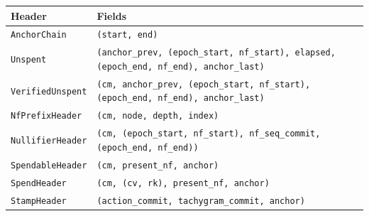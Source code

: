 \documentclass[11pt,a4paper]{article}
\theoremstyle{definition}
\begin{document}
\begin{table}[htbp]
\centering
\small
\begin{tabular}{@{}lp{10.2cm}@{}}
\toprule
Header & Fields \\
\midrule
\texttt{AnchorChain} & \texttt{(start, end)} \\
\texttt{Unspent} & \texttt{(anchor\_prev, (epoch\_start, nf\_start),
  elapsed, (epoch\_end, nf\_end), anchor\_last)} \\
\texttt{VerifiedUnspent} & \texttt{(cm, anchor\_prev, (epoch\_start,
  nf\_start), (epoch\_end, nf\_end), anchor\_last)} \\
\texttt{NfPrefixHeader} & \texttt{(cm, node, depth, index)} \\
\texttt{NullifierHeader} & \texttt{(cm, (epoch\_start, nf\_start),
  nf\_seq\_commit, (epoch\_end, nf\_end))} \\
\texttt{SpendableHeader} & \texttt{(cm, present\_nf, anchor)} \\
\texttt{SpendHeader} & \texttt{(cm, (cv, rk), present\_nf, anchor)} \\
\texttt{StampHeader} & \texttt{(action\_commit, tachygram\_commit,
  anchor)} \\
\bottomrule
\end{tabular}

\medskip


\end{table}
\end{document}
